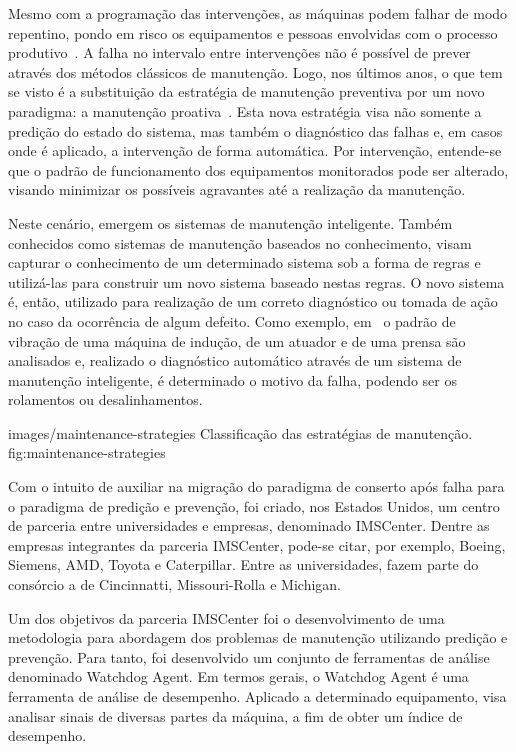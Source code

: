 Mesmo com a programação das intervenções, as máquinas podem falhar de modo repentino, pondo em risco
os equipamentos e pessoas envolvidas com o processo produtivo~\cite{goncalves2011desenvolvimento}. A
falha no intervalo entre intervenções não é possível de prever através dos métodos clássicos de
manutenção. Logo, nos últimos anos, o que tem se visto é a substituição da estratégia de manutenção
preventiva por um novo paradigma: a manutenção proativa~\cite{lee2009informatics}. Esta nova
estratégia visa não somente a predição do estado do sistema, mas também o diagnóstico das falhas e,
em casos onde é aplicado, a intervenção de forma automática. Por intervenção, entende-se que o
padrão de funcionamento dos equipamentos monitorados pode ser alterado, visando minimizar os
possíveis agravantes até a realização da manutenção.

Neste cenário, emergem os sistemas de manutenção inteligente. Também conhecidos como sistemas de
manutenção baseados no conhecimento, visam capturar o conhecimento de um determinado sistema sob a
forma de regras e utilizá-las para construir um novo sistema baseado nestas regras. O novo sistema
é, então, utilizado para realização de um correto diagnóstico ou tomada de ação no caso da
ocorrência de algum defeito. Como exemplo, em~\cite{shikari2004automation} o padrão de vibração de
uma máquina de indução, de um atuador e de uma prensa são analisados e, realizado o diagnóstico
automático através de um sistema de manutenção inteligente, é determinado o motivo da falha, podendo
ser os rolamentos ou desalinhamentos.

    {images/maintenance-strategies}
    {Classificação das estratégias de manutenção.}
    {fig:maintenance-strategies}

Com o intuito de auxiliar na migração do paradigma de conserto após falha para o paradigma de
predição e prevenção, foi criado, nos Estados Unidos, um centro de parceria entre universidades e
empresas, denominado \gls{IMSCenter}. Dentre as empresas integrantes da parceria \gls{IMSCenter},
pode-se citar, por exemplo, Boeing, Siemens, AMD, Toyota e Caterpillar. Entre as universidades,
fazem parte do consórcio a de Cincinnatti, Missouri-Rolla e Michigan.



Um dos objetivos da parceria \gls{IMSCenter} foi o desenvolvimento de uma metodologia para abordagem
dos problemas de manutenção utilizando predição e prevenção. Para tanto, foi desenvolvido um
conjunto de ferramentas de análise denominado Watchdog Agent. Em termos gerais, o Watchdog Agent é
uma ferramenta de análise de desempenho. Aplicado a determinado equipamento, visa analisar sinais de
diversas partes da máquina, a fim de obter um índice de desempenho.

